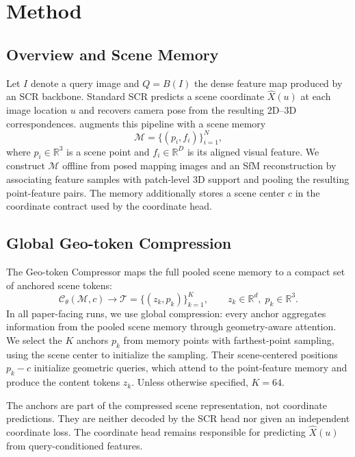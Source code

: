 \section{Method}

\subsection{Overview and Scene Memory}

Let $I$ denote a query image and $Q=B(I)$ the dense feature map produced by an SCR backbone. Standard SCR predicts a scene coordinate $\hat{X}(u)$ at each image location $u$ and recovers camera pose from the resulting 2D--3D correspondences. \method{} augments this pipeline with a scene memory
\begin{equation}
    \mathcal{M}=\{(p_i,f_i)\}_{i=1}^{N},
\end{equation}
where $p_i\in\mathbb{R}^{3}$ is a scene point and $f_i\in\mathbb{R}^{D}$ is its aligned visual feature. We construct $\mathcal{M}$ offline from posed mapping images and an SfM reconstruction by associating feature samples with patch-level 3D support and pooling the resulting point-feature pairs. The memory additionally stores a scene center $c$ in the coordinate contract used by the coordinate head.

\subsection{Global Geo-token Compression}

The Geo-token Compressor maps the full pooled scene memory to a compact set of anchored scene tokens:
\begin{equation}
    \mathcal{C}_{\theta}(\mathcal{M},c)
    \longrightarrow
    \mathcal{T}=\{(z_k,p_k)\}_{k=1}^{K},
    \qquad z_k\in\mathbb{R}^{d},\; p_k\in\mathbb{R}^{3}.
\end{equation}
In all paper-facing runs, we use global compression: every anchor aggregates information from the pooled scene memory through geometry-aware attention. We select the $K$ anchors $p_k$ from memory points with farthest-point sampling, using the scene center to initialize the sampling. Their scene-centered positions $p_k-c$ initialize geometric queries, which attend to the point-feature memory and produce the content tokens $z_k$. Unless otherwise specified, $K=64$.

The anchors are part of the compressed scene representation, not coordinate predictions. They are neither decoded by the SCR head nor given an independent coordinate loss. The coordinate head remains responsible for predicting $\hat{X}(u)$ from query-conditioned features.

